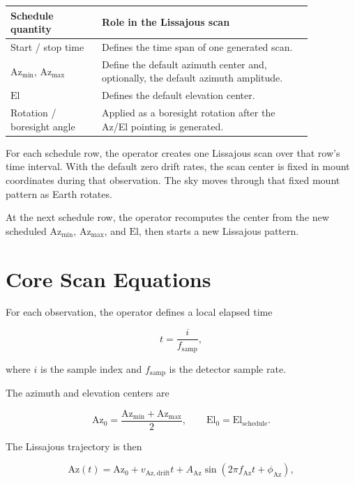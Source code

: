 \documentclass[11pt]{article}
\begin{document}
\begin{center}
\begin{tabular}{>{\raggedright\arraybackslash}p{0.26\linewidth}
                >{\raggedright\arraybackslash}p{0.60\linewidth}}
\toprule
Schedule quantity & Role in the Lissajous scan \\
\midrule
Start / stop time & Defines the time span of one generated scan. \\
\(\mathrm{Az}_{\min}\), \(\mathrm{Az}_{\max}\) & Define the default azimuth center and, optionally, the default azimuth amplitude. \\
\(\mathrm{El}\) & Defines the default elevation center. \\
Rotation / boresight angle & Applied as a boresight rotation after the Az/El pointing is generated. \\
\bottomrule
\end{tabular}
\end{center}

For each schedule row, the operator creates one Lissajous scan over that row's
time interval.  With the default zero drift rates, the scan center is fixed in
mount coordinates during that observation.  The sky moves through that fixed
mount pattern as Earth rotates.

At the next schedule row, the operator recomputes the center from the new
scheduled \(\mathrm{Az}_{\min}\), \(\mathrm{Az}_{\max}\), and \(\mathrm{El}\),
then starts a new Lissajous pattern.

\section*{Core Scan Equations}

For each observation, the operator defines a local elapsed time

\[
    t = \frac{i}{f_{\mathrm{samp}}},
\]

where \(i\) is the sample index and \(f_{\mathrm{samp}}\) is the detector sample
rate.

The azimuth and elevation centers are

\[
    \mathrm{Az}_{0} =
    \frac{\mathrm{Az}_{\min} + \mathrm{Az}_{\max}}{2},
    \qquad
    \mathrm{El}_{0} = \mathrm{El}_{\mathrm{schedule}}.
\]

The Lissajous trajectory is then

\[
    \mathrm{Az}(t) =
    \mathrm{Az}_{0}
    + v_{\mathrm{Az,drift}} t
    + A_{\mathrm{Az}}
      \sin \left(2\pi f_{\mathrm{Az}} t + \phi_{\mathrm{Az}}\right),
\]
\end{document}
